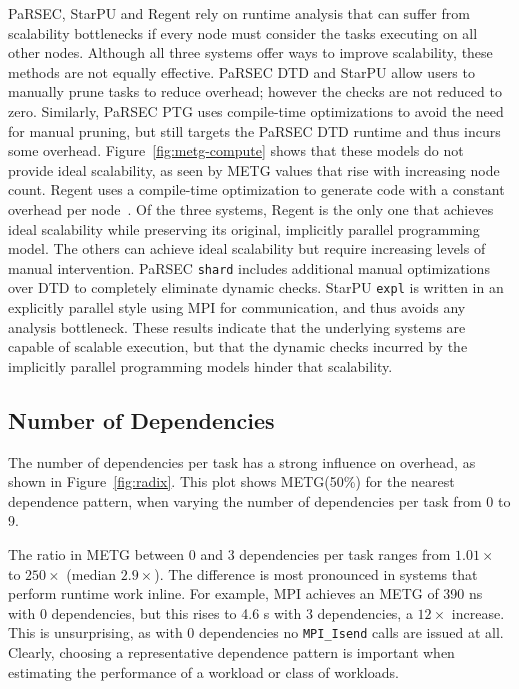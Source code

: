 PaRSEC, StarPU and Regent rely on runtime analysis that can suffer
from scalability bottlenecks if every node must consider the tasks
executing on all other nodes. Although all three systems offer ways to
improve scalability, these methods are not equally effective. PaRSEC
DTD and StarPU allow users to manually prune tasks to reduce overhead;
however the checks are not reduced to zero. Similarly, PaRSEC PTG uses
compile-time optimizations to avoid the need for manual pruning, but
still targets the PaRSEC DTD runtime and thus incurs some
overhead. Figure~\ref{fig:metg-compute} shows that these models do not
provide ideal scalability, as seen by METG values that rise with
increasing node count. Regent uses a compile-time optimization to
generate code with a constant overhead per
node~\cite{ControlReplication17}. Of the three systems, Regent is the
only one that achieves ideal scalability while preserving its
original, implicitly parallel programming model. The others can
achieve ideal scalability but require increasing levels of manual
intervention. PaRSEC \lstinline{shard} includes additional manual
optimizations over DTD to completely eliminate dynamic checks. StarPU
\lstinline{expl} is written in an explicitly parallel style using MPI
for communication, and thus avoids any analysis bottleneck. These
results indicate that the underlying systems are capable of scalable
execution, but that the dynamic checks incurred by the implicitly
parallel programming models hinder that scalability.

\subsection{Number of Dependencies}
\label{subsec:number-of-dependencies}

The number of dependencies per task has a strong influence on
overhead, as shown in
Figure~\ref{fig:radix}. This plot shows METG(50\%) for the nearest
dependence pattern, when varying the number of dependencies per task
from 0 to 9.



The ratio in METG between 0 and 3 dependencies per task ranges from
$1.01\times$ to $250\times$ (median $2.9\times$). The difference is most pronounced in systems that
perform runtime work inline. For example, MPI achieves an METG of 390
ns with 0 dependencies, but this rises to 4.6 \textmu{}s with 3 dependencies,
a $12\times$ increase. This is unsurprising, as with
0 dependencies no \lstinline[language=C++]{MPI_Isend} calls are
issued at all. Clearly, choosing a representative dependence
pattern is important when estimating the performance of a workload or
class of workloads.

